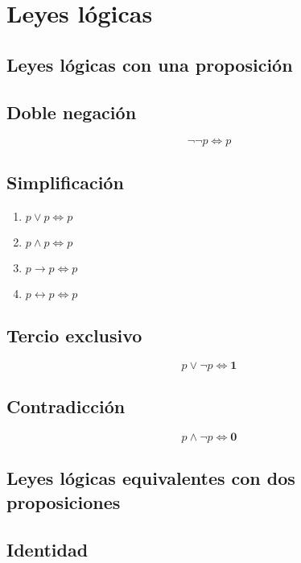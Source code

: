 \section{Leyes lógicas}

\subsection{Leyes lógicas con una proposición}

\subsection{Doble negación}

\[
 \neg \neg p \Leftrightarrow p
\]


\subsection{Simplificación}

\begin{enumerate}
 \item $p \vee p \Leftrightarrow p$
 \item $p \wedge p \Leftrightarrow p$
 \item $p \rightarrow p \Leftrightarrow p$
 \item $p \leftrightarrow p \Leftrightarrow p$
\end{enumerate}

\subsection{Tercio exclusivo}

\[
 p \vee \neg p \Leftrightarrow \textbf{1}
\]

\subsection{Contradicción}

\[
 p \wedge \neg p \Leftrightarrow \textbf{0}
\]

\subsection{Leyes lógicas equivalentes con dos proposiciones}

\subsection{Identidad}

